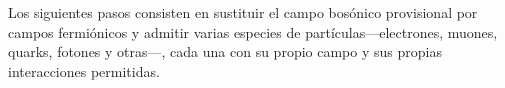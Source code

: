 Los siguientes pasos consisten en sustituir el campo bosónico provisional por campos fermiónicos y admitir varias especies de partículas---electrones, muones, quarks, fotones y otras---, cada una con su propio campo y sus propias interacciones permitidas.

\begin{classroomqa}
\end{classroomqa}